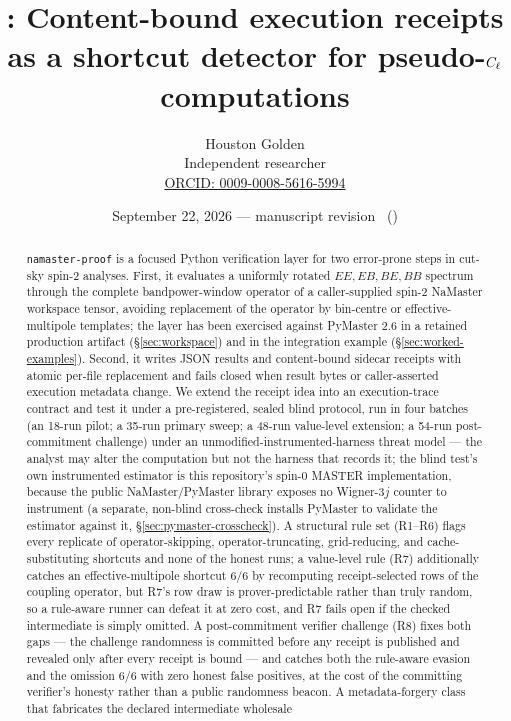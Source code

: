 \documentclass[11pt]{article}
\title{\software: Content-bound execution receipts as a shortcut
detector for pseudo-\(C_\ell\) computations}
\author{Houston Golden\\Independent researcher\\[2pt]\href{https://orcid.org/0009-0008-5616-5994}{\footnotesize ORCID: 0009-0008-5616-5994}}
\date{September 22, 2026 --- manuscript revision \paperVersion\ (\paperTimestamp)}
\newcommand{\software}{\texttt{namaster-proof}}
\begin{document}
\maketitle

\begin{abstract}
\software{} is a focused Python verification layer for two error-prone steps
in cut-sky spin-2 analyses.  First, it evaluates a uniformly rotated
\(EE,EB,BE,BB\) spectrum through the complete bandpower-window operator of a
caller-supplied spin-2 NaMaster workspace tensor, avoiding replacement of the
operator by bin-centre or effective-multipole templates; the layer has been
exercised against PyMaster 2.6 in a retained production artifact
(\S\ref{sec:workspace}) and in the integration example
(\S\ref{sec:worked-examples}).  Second, it writes JSON results
and content-bound sidecar receipts with atomic per-file replacement and fails
closed when result bytes or caller-asserted execution metadata change.  We
extend the receipt idea into an execution-trace contract and test it under a
pre-registered, sealed blind protocol, run in four batches (an 18-run pilot;
a 35-run primary sweep; a 48-run value-level extension; a 54-run
post-commitment challenge) under an unmodified-instrumented-harness threat
model --- the analyst may alter the computation but not the harness that
records it; the blind test's own instrumented estimator is this
repository's spin-0 MASTER implementation, because the public NaMaster/PyMaster
library exposes no Wigner-3\(j\) counter to instrument (a separate, non-blind
cross-check installs PyMaster to validate the estimator against it,
\S\ref{sec:pymaster-crosscheck}). A
structural rule set (R1--R6) flags every replicate of operator-skipping,
operator-truncating, grid-reducing, and cache-substituting shortcuts and
none of the honest runs; a value-level rule (R7) additionally catches an
effective-multipole shortcut 6/6 by recomputing receipt-selected rows of the
coupling operator, but R7's row draw is prover-predictable rather than
truly random, so a rule-aware runner can defeat it at zero cost, and R7
fails open if the checked intermediate is simply omitted. A
post-commitment verifier challenge (R8) fixes both gaps --- the challenge
randomness is committed before any receipt is published and revealed only
after every receipt is bound --- and catches both the rule-aware evasion
and the omission 6/6 with zero honest false positives, at the cost of the
committing verifier's honesty rather than a public randomness beacon. A
metadata-forgery class that fabricates the declared intermediate wholesale

\end{abstract}
\end{document}
